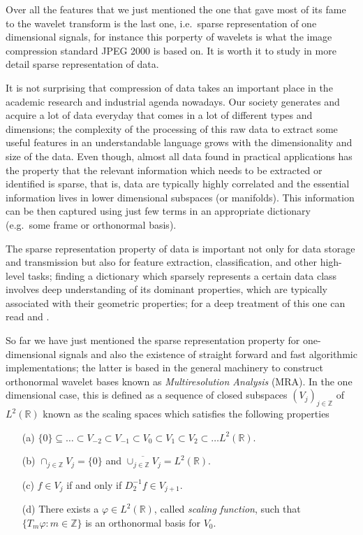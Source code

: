 \bigskip

Over all the features that we just mentioned the one that gave most of its fame to the wavelet transform is the last one, i.e.\ sparse representation of one dimensional signals, for instance this porperty of wavelets is what the image compression standard JPEG 2000 is based on. It is worth it to study in more detail sparse representation of data.

\bigskip

It is not surprising that compression of data takes an important place in the academic research and industrial agenda nowadays. Our society generates and acquire a lot of data everyday that comes in a lot of different types and dimensions; the complexity of the processing of this raw data to extract some useful features in an understandable language grows with the dimensionality and size of the data. Even though, almost all data found in practical applications has the property that the relevant information which needs to be extracted or identified is sparse, that is, data are typically highly correlated and the essential information lives in lower dimensional subspaces (or manifolds). This information can be then captured using just few terms in an appropriate dictionary (e.g.\ some frame or orthonormal basis). 

\bigskip

The sparse representation property of data is important not only for data storage and transmission but also for feature extraction, classification, and other high-level tasks; finding a dictionary which sparsely represents a certain data class involves deep understanding of its dominant properties, which are typically associated with their geometric properties; for a deep treatment of this one can read \cite{IntroShearlets} and \cite{Gitta-Lim}.

\bigskip

So far we have just mentioned the sparse representation property for one-dimensional signals and also the existence of straight forward and fast algorithmic implementations; the latter is based in the general machinery to construct orthonormal wavelet bases known as \textit{Multiresolution Analysis} (MRA). In the one dimensional case, this is defined as a sequence of closed subspaces $(V_j)_{j\in\mathbb{Z}}$ of $L^2(\mathbb{R})$ known as the scaling spaces which satisfies the following properties

\begin{enumerate}
\item[(a)] $\{0\}\subseteq\ldots\subset V_{-2}\subset V_{-1}\subset V_0\subset V_1\subset V_2\subset\ldots L^2(\mathbb{R})$.
\item[(b)] $\cap_{j\in\mathbb{Z}}V_j=\{0\}$ and $\overline{\cup_{j\in\mathbb{Z}}V_j}=L^2(\mathbb{R})$.
\item[(c)] $f\in V_j$ if and only if $D_2^{-1}f\in V_{j+1}$.
\item[(d)] There exists a $\varphi\in L^2(\mathbb{R})$, called \textit{scaling function}, such that $\{T_m\varphi:m\in\mathbb{Z}\}$ is an orthonormal basis for $V_0$.
\end{enumerate}

